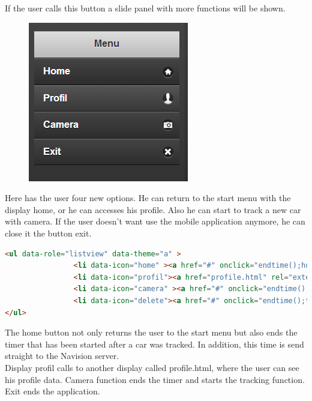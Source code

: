 If the user calls this button a slide panel with more functions will be shown.
\\
\begin{figure}[h]
\centering
\includegraphics[width=0.4\linewidth]{graphics/chapter4/14}
\caption{}
\label{fig:15}
\end{figure}
\newpage
Here has the user four new options. He can return to the start menu with the display home, or he can accesses his profile. Also he can start to track a new car with camera. If the user doesn’t want use the mobile application anymore, he can close it the button exit. 
\\
\begin{lstlisting}[language=html, caption= 
start timer function,captionpos=b]
<ul data-role="listview" data-theme="a" >
                <li data-icon="home" ><a href="#" onclick="endtime();home();">Home</a></li>
                <li data-icon="profil"><a href="profile.html" rel="external" >Profil</a></li>
                <li data-icon="camera" ><a href="#" onclick="endtime();trackClick();">Camera</a></li>
                <li data-icon="delete"><a href="#" onclick="endtime();turnOff();">Exit</a></li>
</ul>
\end{lstlisting}

The home button not only returns the user to the start menu but also ends the timer that has been started after a car was tracked. In addition, this time is send straight to the Navision server.  
\\

Display profil calls to another display called profile.html, where the user can see his profile data. 
Camera function ends the timer and starts the tracking function. Exit ends the application.



